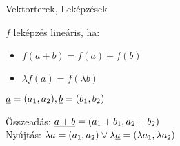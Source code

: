 

\begin{frame}[plain]
\begin{tcolorbox}[center, colback={myyellow}, coltext={black}, colframe={myyellow}]
    {\RHuge Vektorterek, Leképzések}
    \mmedskip
\end{tcolorbox}
\end{frame}

\begin{frame}
  \begin{tcolorbox}[title={Def.: Linearitás}]
    $f$ leképzés lineáris, ha:\\
    \begin{itemize}
      \item $f(a + b) = f(a) + f(b)$
      \item ${\lambda}f(a) = f({\lambda}b)$
    \end{itemize}
  \end{tcolorbox}


  \begin{tcolorbox}[title={Def.: Vektorok}]
  $\underline{a} = (a_1, a_2), \underline{b} = (b_1, b_2)$\\
  \mmedskip
  
    Összeadás: $\underline{a + b} = (a_1 + b_1, a_2 + b_2)$\\
    Nyújtás: ${\lambda}a = (a_1, a_2) \lor {\lambda}\underline{a} = ({\lambda}a_1, {\lambda}a_2)$
  \end{tcolorbox}
  
  \end{frame}
  
